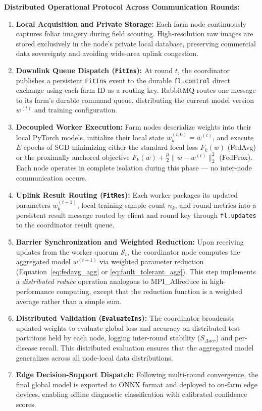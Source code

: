\documentclass[applsci,article,submit,oneauthor,pdftex]{Definitions/mdpi}
\begin{document}
\textbf{Distributed Operational Protocol Across Communication Rounds:}
\begin{enumerate}[leftmargin=*]
    \item \textbf{Local Acquisition and Private Storage:} Each farm node continuously captures foliar imagery during field scouting. High-resolution raw images are stored exclusively in the node's private local database, preserving commercial data sovereignty and avoiding wide-area uplink congestion.
    \item \textbf{Downlink Queue Dispatch (\texttt{FitIns}):} At round $t$, the coordinator publishes a persistent \texttt{FitIns} event to the durable \texttt{fl.control} direct exchange using each farm ID as a routing key. RabbitMQ routes one message to its farm's durable command queue, distributing the current model version $w^{(t)}$ and training configuration.
    \item \textbf{Decoupled Worker Execution:} Farm nodes deserialize weights into their local PyTorch models, initialize their local state $w_k^{(t, 0)} = w^{(t)}$, and execute $E$ epochs of SGD minimizing either the standard local loss $F_k(w)$ (FedAvg) or the proximally anchored objective $F_k(w) + \frac{\mu}{2}\|w - w^{(t)}\|_2^2$ (FedProx). Each node operates in complete isolation during this phase --- no inter-node communication occurs.
    \item \textbf{Uplink Result Routing (\texttt{FitRes}):} Each worker packages its updated parameters $w_k^{(t+1)}$, local training sample count $n_k$, and round metrics into a persistent result message routed by client and round key through \texttt{fl.updates} to the coordinator result queue.
    \item \textbf{Barrier Synchronization and Weighted Reduction:} Upon receiving updates from the worker quorum $\mathcal{S}_t$, the coordinator node computes the aggregated model $w^{(t+1)}$ via weighted parameter reduction (Equation~\eqref{eq:fedavg_agg} or \eqref{eq:fault_tolerant_agg}). This step implements a \textit{distributed reduce} operation analogous to MPI\_Allreduce in high-performance computing, except that the reduction function is a weighted average rather than a simple sum.
    \item \textbf{Distributed Validation (\texttt{EvaluateIns}):} The coordinator broadcasts updated weights to evaluate global loss and accuracy on distributed test partitions held by each node, logging inter-round stability ($S_{\Delta acc}$) and per-disease recall. This distributed evaluation ensures that the aggregated model generalizes across all node-local data distributions.
    \item \textbf{Edge Decision-Support Dispatch:} Following multi-round convergence, the final global model is exported to ONNX format and deployed to on-farm edge devices, enabling offline diagnostic classification with calibrated confidence scores.
\end{enumerate}
\end{document}
